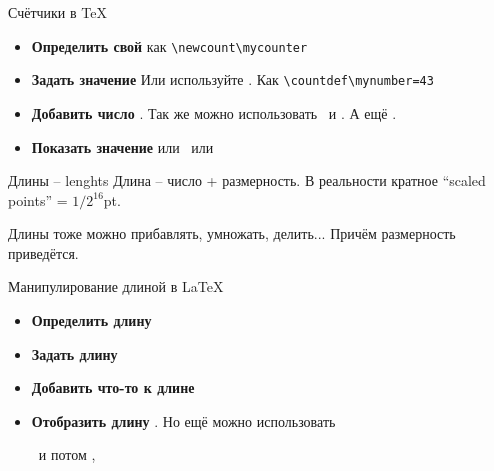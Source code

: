 \begin{frame}[fragile]{Счётчики в \TeX}\relax
    \begin{itemize}
        \item \textbf{Определить свой} \ccol\newcount{} как \verb|\newcount\mycounter|
        \item \textbf{Задать значение}   Или используйте \ccol\countdef. Как \verb|\countdef\mynumber=43|
        \item \textbf{Добавить число}  . Так же можно использовать \ccol\multiply\ и \ccol\divide. А ещё \ccol\numexp.
        \item \textbf{Показать значение}  или \ccol\number\ или \ccol\romannumeral
         
    \end{itemize}
     
     
     
\end{frame}


\begin{frame}{Длины -- lenghts}\relax
    Длина -- число + размерность. В реальности кратное ``scaled points'' = $1/2^{16}$pt.
    
    Длины тоже можно прибавлять, умножать, делить... Причём размерность приведётся.
\end{frame}

\begin{frame}{Манипулирование длиной в \LaTeX\lW}\relax

    \begin{itemize}
        \item \textbf{Определить длину} 
        \item \textbf{Задать длину} \ccol{\setlength}
        \item \textbf{Добавить что-то к длине}  \ccol{\addtolength}
        \item \textbf{Отобразить длину} . Но ещё можно использовать \ncol\usepackage{printlen}\ и потом \ccol\uselengthunit, \ccol\printlength
         
    \end{itemize}
    
\end{frame}

